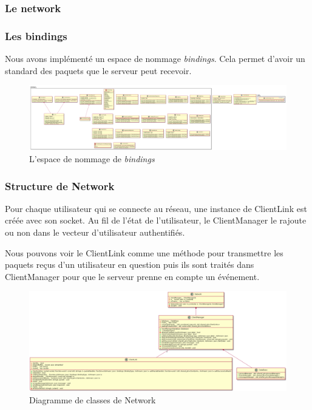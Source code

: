 \documentclass{article}
\begin{document}
\subsubsection{Le network}

\subsubsection*{Les bindings}

Nous avons implémenté un espace de nommage \textit{bindings}. Cela permet d'avoir un standard des paquets que le serveur peut recevoir.

\begin{figure}[H]
	\centering
	 \includegraphics[scale=0.1, angle=90]{../res/uml/class/BindingClass.png}
	 \caption{L'espace de nommage de \textit{bindings}}
	 \label{fig:BindingDiagram}
\end{figure}

\subsubsection*{Structure de Network}

Pour chaque utilisateur qui se connecte au réseau, une instance de ClientLink est créée avec son socket. Au fil de l'état de l'utilisateur, le ClientManager le rajoute ou non dans le vecteur d'utilisateur authentifiés. 

Nous pouvons voir le ClientLink comme une méthode pour transmettre les paquets reçus d'un utilisateur en question puis ils sont traités dans ClientManager pour que le serveur prenne en compte un événement.

\begin{figure}[H]
	\centering
	 \includegraphics[scale=0.2]{../res/uml/class/NetworkClass.png}
	 \caption{Diagramme de classes de Network}
	 \label{fig:NetworkDiagram}
\end{figure}
\end{document}
